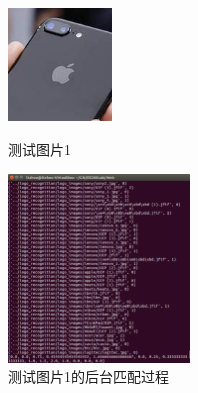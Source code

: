\begin{figure}[htbp]
\centering
\begin{minipage}[t]{0.48\textwidth}
\centering
\includegraphics[height=3cm]{img/zlt/test1.jpg}
\caption{测试图片1}
\label{fig:zlt_test1}
\end{minipage}
\begin{minipage}[t]{0.48\textwidth}
\centering
\includegraphics[height=5cm]{img/zlt/pictmatch1_2.png}
\caption{测试图片1的后台匹配过程}
\label{fig:zlt_pictmatch1_2}
\end{minipage}
\end{figure} 

